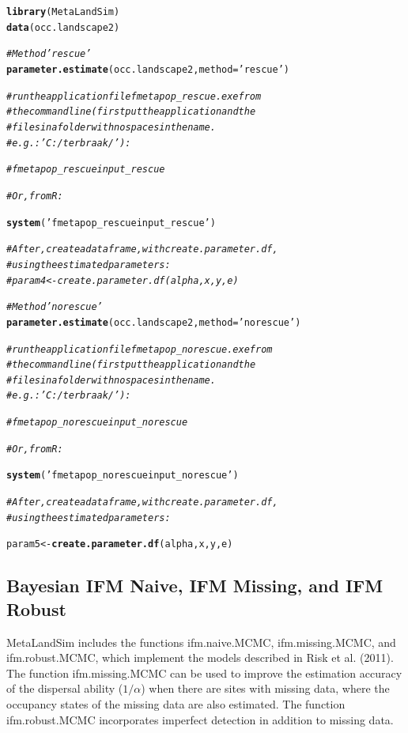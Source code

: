 \documentclass{article}\usepackage[]{graphicx}\usepackage[]{xcolor}
\makeatletter
\newcommand{\hlsng}[1]{\textcolor[rgb]{0.192,0.494,0.8}{#1}}%
\newcommand{\hlcom}[1]{\textcolor[rgb]{0.678,0.584,0.686}{\textit{#1}}}%
\newcommand{\hldef}[1]{\textcolor[rgb]{0.345,0.345,0.345}{#1}}%
\newcommand{\hlkwb}[1]{\textcolor[rgb]{0.69,0.353,0.396}{#1}}%
\newcommand{\hlkwc}[1]{\textcolor[rgb]{0.333,0.667,0.333}{#1}}%
\newcommand{\hlkwd}[1]{\textcolor[rgb]{0.737,0.353,0.396}{\textbf{#1}}}%
\newenvironment{kframe}{%
 \def\at@end@of@kframe{}%
 \ifinner\ifhmode%
  \def\at@end@of@kframe{\end{minipage}}%
  \begin{minipage}{\columnwidth}%
 \fi\fi%
 \def\FrameCommand##1{\hskip\@totalleftmargin \hskip-\fboxsep
 \colorbox{shadecolor}{##1}\hskip-\fboxsep
     \hskip-\linewidth \hskip-\@totalleftmargin \hskip\columnwidth}%
 \MakeFramed {\advance\hsize-\width
   \@totalleftmargin\z@ \linewidth\hsize
   \@setminipage}}%
 {\par\unskip\endMakeFramed%
 \at@end@of@kframe}
\newenvironment{knitrout}{}{} %
\makeatother
\begin{document}
\begin{knitrout}
\color{fgcolor}\begin{kframe}
\begin{alltt}
\hlkwd{library}\hldef{(MetaLandSim)}
\hlkwd{data}\hldef{(occ.landscape2)}

\hlcom{#Method 'rescue'}
\hlkwd{parameter.estimate} \hldef{(occ.landscape2,} \hlkwc{method}\hldef{=}\hlsng{'rescue'}\hldef{)}

\hlcom{#run the application file fmetapop_rescue.exe from }
\hlcom{#the command line (first put the application and the }
\hlcom{#files in a folder with no spaces in the name. }
\hlcom{#e.g.: 'C:/terbraak/'):}

\hlcom{#fmetapop_rescue input_rescue}

\hlcom{#Or, from R:}

\hlkwd{system}\hldef{(}\hlsng{'fmetapop_rescue input_rescue'}\hldef{)}

\hlcom{#After, create a data frame, with create.parameter.df, }
\hlcom{#using the estimated parameters:}
\hlcom{#param4 <- create.parameter.df(alpha, x, y, e)}

\hlcom{#Method 'norescue'}
\hlkwd{parameter.estimate} \hldef{(occ.landscape2,} \hlkwc{method}\hldef{=}\hlsng{'norescue'}\hldef{)}

\hlcom{#run the application file fmetapop_norescue.exe from }
\hlcom{#the command line (first put the application and the }
\hlcom{#files in a folder with no spaces in the name. }
\hlcom{#e.g.: 'C:/terbraak/'):}

\hlcom{#fmetapop_norescue input_norescue}

\hlcom{#Or, from R:}

\hlkwd{system}\hldef{(}\hlsng{'fmetapop_norescue input_norescue'}\hldef{)}

\hlcom{#After, create a data frame, with create.parameter.df, }
\hlcom{#using the estimated parameters:}

\hldef{param5} \hlkwb{<-} \hlkwd{create.parameter.df}\hldef{(alpha, x, y, e)}
\end{alltt}
\end{kframe}
\end{knitrout}

\subsection{Bayesian IFM Naive, IFM Missing, and IFM Robust}

MetaLandSim includes the functions ifm.naive.MCMC, ifm.missing.MCMC, and ifm.robust.MCMC, which implement the models described in Risk et al. (2011). The function ifm.missing.MCMC can be used to improve the estimation accuracy of the dispersal ability ($1/\alpha$) when there are sites with missing data, where the occupancy states of the missing data are also estimated. The function ifm.robust.MCMC incorporates imperfect detection in addition to missing data. 
\end{document}
